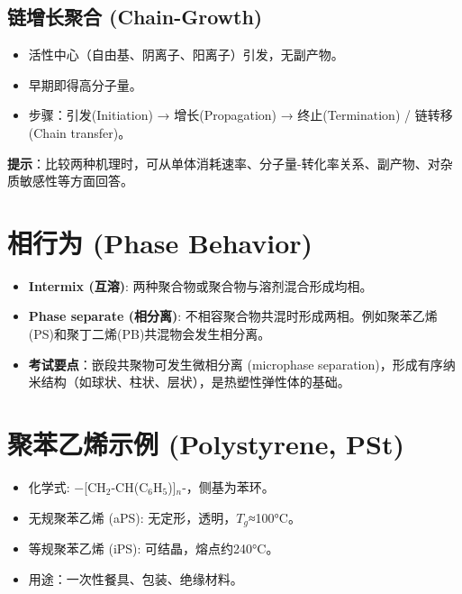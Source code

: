 \documentclass[12pt,a4paper]{ctexart}
\begin{document}
\subsection{链增长聚合 (Chain-Growth)}
\begin{itemize}
    \item 活性中心（自由基、阴离子、阳离子）引发，无副产物。
    \item 早期即得高分子量。
    \item 步骤：引发(Initiation) → 增长(Propagation) → 终止(Termination) / 链转移(Chain transfer)。
\end{itemize}

\textbf{提示}：比较两种机理时，可从单体消耗速率、分子量-转化率关系、副产物、对杂质敏感性等方面回答。

\section{相行为 (Phase Behavior)}
\begin{itemize}
    \item \textbf{Intermix (互溶)}: 两种聚合物或聚合物与溶剂混合形成均相。
    \item \textbf{Phase separate (相分离)}: 不相容聚合物共混时形成两相。例如聚苯乙烯(PS)和聚丁二烯(PB)共混物会发生相分离。
    \item \textbf{考试要点}：嵌段共聚物可发生微相分离 (microphase separation)，形成有序纳米结构（如球状、柱状、层状），是热塑性弹性体的基础。
\end{itemize}

\section{聚苯乙烯示例 (Polystyrene, PSt)}
\begin{itemize}
    \item 化学式: $-$[CH$_2$-CH(C$_6$H$_5$)]$_n$-，侧基为苯环。
    \item 无规聚苯乙烯 (aPS): 无定形，透明，$T_g$≈100°C。
    \item 等规聚苯乙烯 (iPS): 可结晶，熔点约240°C。
    \item 用途：一次性餐具、包装、绝缘材料。
\end{itemize}
\end{document}
